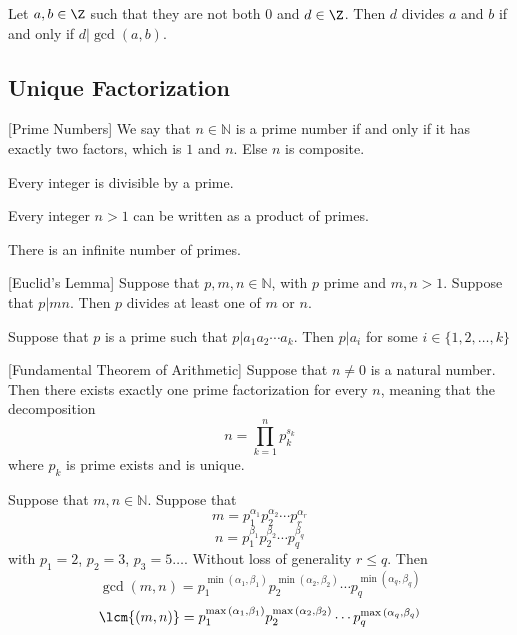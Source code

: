 \begin{crl} Let $a,b\in\Z$ such that they are not both $0$ and $d\in\Z$. Then $d$ divides $a$ and $b$ if and only if $d|\gcd(a,b)$. 
\end{crl}

\subsection{Unique Factorization}
\begin{defn}{}{}[Prime Numbers] We say that $n\in\mathbb{N}$ is a prime number if and only if it has exactly two factors, which is $1$ and $n$. Else $n$ is composite. 
\end{defn}

\begin{lmm}{}{} Every integer is divisible by a prime. 
\end{lmm}

\begin{lmm}{}{} Every integer $n>1$ can be written as a product of primes. 
\end{lmm}

\begin{thm}{}{} There is an infinite number of primes. 
\end{thm}

\begin{prp}{}{}[Euclid's Lemma] Suppose that $p,m,n\in\mathbb{N}$, with $p$ prime and $m,n>1$. Suppose that $p|mn$. Then $p$ divides at least one of $m$ or $n$. 
\end{prp}

\begin{prp}{}{} Suppose that $p$ is a prime such that $p|a_1a_2\cdots a_k$. Then $p|a_i$ for some $i\in\{1,2,\dots,k\}$
\end{prp}

\begin{thm}{}{}[Fundamental Theorem of Arithmetic] Suppose that $n\neq 0$ is a natural number. Then there exists exactly one prime factorization for every $n$, meaning that the decomposition $$n=\prod_{k=1}^np_k^{s_k}$$ where $p_k$ is prime exists and is unique. 
\end{thm}

\begin{thm}{}{} Suppose that $m,n\in\mathbb{N}$. Suppose that 
$$m=p_1^{\alpha_1}p_2^{\alpha_2}\cdots p_r^{\alpha_r}$$
$$n=p_1^{\beta_1}p_2^{\beta_2}\cdots p_q^{\beta_q}$$
with $p_1=2$, $p_2=3$, $p_3=5\dots$. Without loss of generality $r\leq q$. Then $$\gcd{(m,n)}=p_1^{\min{(\alpha_1,\beta_1)}}p_2^{\min{(\alpha_2,\beta_2)}}\cdots p_q^{\min{(\alpha_q,\beta_q)}}$$
$$\lcm{(m,n)}=p_1^{\max{(\alpha_1,\beta_1)}}p_2^{\max{(\alpha_2,\beta_2)}}\cdots p_q^{\max{(\alpha_q,\beta_q)}}$$
\end{thm}

